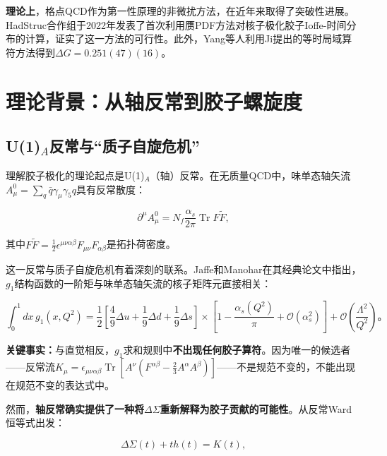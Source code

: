 \documentclass[12pt,a4paper]{ctexart}
\theoremstyle{definition}
\begin{document}
\textbf{理论上}，格点QCD作为第一性原理的非微扰方法，在近年来取得了突破性进展。HadStruc合作组于2022年发表了首次利用赝PDF方法对核子极化胶子Ioffe-时间分布的计算\cite{Egerer2022}，证实了这一方法的可行性。此外，Yang等人利用Ji提出的等时局域算符方法\cite{Ji2013gluon}得到$\Delta G = 0.251(47)(16)$。

\section{理论背景：从轴反常到胶子螺旋度}

\subsection{U(1)$_A$反常与``质子自旋危机''}

理解胶子极化的理论起点是U(1)$_A$（轴）反常。在无质量QCD中，味单态轴矢流$A^0_\mu = \sum_q \bar{q}\gamma_\mu\gamma_5 q$具有反常散度\cite{JaffeManohar1990}：

\begin{equation}
\partial^\mu A^0_\mu = N_f \frac{\alpha_s}{2\pi} \operatorname{Tr} F\tilde{F},
\label{eq:anomaly}
\end{equation}

其中$F\tilde{F} = \frac{1}{2}\epsilon^{\mu\nu\alpha\beta}F_{\mu\nu}F_{\alpha\beta}$是拓扑荷密度。

这一反常与质子自旋危机有着深刻的联系。Jaffe和Manohar在其经典论文\cite{JaffeManohar1990}中指出，$g_1$结构函数的一阶矩与味单态轴矢流的核子矩阵元直接相关：

\begin{equation}
\int_0^1 dx\, g_1(x, Q^2) = \frac{1}{2}\left[\frac{4}{9}\Delta u + \frac{1}{9}\Delta d + \frac{1}{9}\Delta s\right] \times \left[1 - \frac{\alpha_s(Q^2)}{\pi} + \mathcal{O}(\alpha_s^2)\right] + \mathcal{O}\left(\frac{\Lambda^2}{Q^2}\right)。
\label{eq:g1_sum_rule}
\end{equation}

\textbf{关键事实：}与直觉相反，$g_1$求和规则中\textbf{不出现任何胶子算符}。因为唯一的候选者——反常流$K_\mu = \epsilon_{\mu\nu\alpha\beta}\operatorname{Tr}[A^\nu(F^{\alpha\beta} - \frac{2}{3}A^\alpha A^\beta)]$——不是规范不变的，不能出现在规范不变的表达式中\cite{JaffeManohar1990}。

然而，\textbf{轴反常确实提供了一种将$\Delta\Sigma$重新解释为胶子贡献的可能性}。从反常Ward恒等式出发：

\begin{equation}
\Delta\Sigma(t) + t h(t) = K(t),
\label{eq:ward_identity}
\end{equation}
\end{document}
